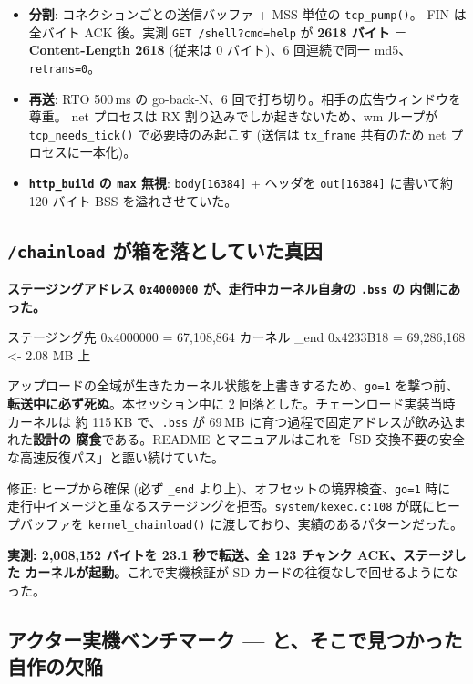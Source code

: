 \documentclass[a4paper,11pt]{ltjsarticle}
\begin{document}
\begin{itemize}[leftmargin=1.4em,itemsep=2pt]
\item \textbf{分割}: コネクションごとの送信バッファ + MSS 単位の \texttt{tcp\_pump()}。
      FIN は全バイト ACK 後。実測 \texttt{GET /shell?cmd=help} が\textbf{ 2618 バイト =
      Content-Length 2618} (従来は 0 バイト)、6 回連続で同一 md5、\texttt{retrans=0}。
\item \textbf{再送}: RTO 500\,ms の go-back-N、6 回で打ち切り。相手の広告ウィンドウを尊重。
      net プロセスは RX 割り込みでしか起きないため、wm ループが \texttt{tcp\_needs\_tick()}
      で必要時のみ起こす (送信は \texttt{tx\_frame} 共有のため net プロセスに一本化)。
\item \textbf{\texttt{http\_build} の \texttt{max} 無視}: \texttt{body[16384]} + ヘッダを
      \texttt{out[16384]} に書いて約 120 バイト BSS を溢れさせていた。
\end{itemize}

\subsection{\texttt{/chainload} が箱を落としていた真因}

\textbf{ステージングアドレス \texttt{0x4000000} が、走行中カーネル自身の \texttt{.bss} の
内側にあった。}

\begin{code}
ステージング先   0x4000000 = 67,108,864
カーネル _end    0x4233B18 = 69,286,168   <- 2.08 MB 上
\end{code}

アップロードの全域が生きたカーネル状態を上書きするため、\texttt{go=1} を撃つ前、
\textbf{転送中に必ず死ぬ}。本セッション中に 2 回落とした。チェーンロード実装当時カーネルは
約 115\,KB で、\texttt{.bss} が 69\,MB に育つ過程で固定アドレスが飲み込まれた\textbf{設計の
腐食}である。README とマニュアルはこれを「SD 交換不要の安全な高速反復パス」と謳い続けていた。

修正: ヒープから確保 (必ず \texttt{\_end} より上)、オフセットの境界検査、\texttt{go=1} 時に
走行中イメージと重なるステージングを拒否。\texttt{system/kexec.c:108} が既にヒープバッファを
\texttt{kernel\_chainload()} に渡しており、実績のあるパターンだった。

\textbf{実測: 2,008,152 バイトを 23.1 秒で転送、全 123 チャンク ACK、ステージした
カーネルが起動。}これで実機検証が SD カードの往復なしで回せるようになった。

\subsection{アクター実機ベンチマーク --- と、そこで見つかった自作の欠陥}
\end{document}
